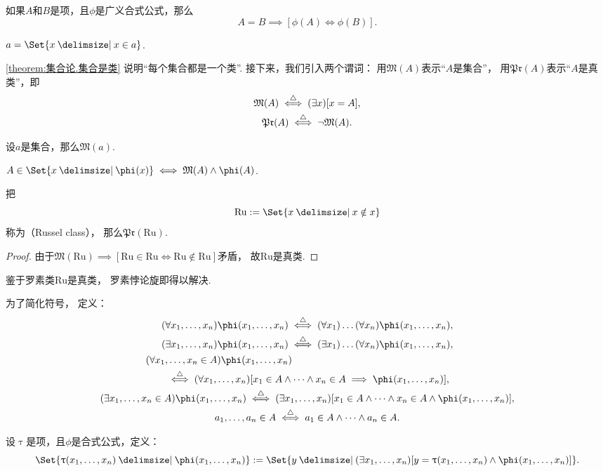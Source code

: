 \begin{theorem}
如果\(A\)和\(B\)是项，且\(\phi\)是广义合式公式，那么\begin{equation*}
	A=B \implies [\phi(A)\iff\phi(B)].
\end{equation*}
\end{theorem}

\begin{theorem}\label{theorem:集合论.集合是类}
\(a=\Set{ x \given x \in a }\).
\end{theorem}
\cref{theorem:集合论.集合是类} 说明“每个集合都是一个类”.
接下来，我们引入两个谓词：
用\(\mathfrak{M}(A)\)表示“\(A\)是集合”，
用\(\mathfrak{Pr}(A)\)表示“\(A\)是真类”，即\begin{gather*}
	\mathfrak{M}(A) \overset{\triangle}{\iff} (\exists x)[x = A], \\
	\mathfrak{Pr}(A) \overset{\triangle}{\iff} \neg\mathfrak{M}(A).
\end{gather*}

\begin{theorem}
设\(a\)是集合，那么\(\mathfrak{M}(a)\).
\end{theorem}

\begin{theorem}
\(A \in \Set{ x \given \phi(x) } \iff \mathfrak{M}(A) \land \phi(A)\).
\end{theorem}

\begin{theorem}
\def\Ru{\mathrm{Ru}}
把\begin{equation*}
	\Ru \defeq \Set{ x \given x \notin x }
\end{equation*}称为{\rm{}（Russel class）}，
那么\(\mathfrak{Pr}(\Ru)\).
\begin{proof}
由于\(\mathfrak{M}(\Ru)
\implies
[\Ru\in\Ru\iff\Ru\notin\Ru]\)矛盾，
故\(\Ru\)是真类.
\end{proof}
\end{theorem}
鉴于罗素类\(\mathrm{Ru}\)是真类，
罗素悖论旋即得以解决.

\begin{definition}
为了简化符号，
\def\x{x_1,\dotsc,x_n}
定义：\begin{gather}
	(\forall\x)\phi(\x)
	\defiff
	(\forall x_1)\dotso(\forall x_n)\phi(\x), \\
	(\exists\x)\phi(\x)
	\defiff
	(\exists x_1)\dotso(\forall x_n)\phi(\x), \\
	\begin{split}
		&\hspace{-20pt}
		(\forall\x\in A)\phi(\x) \\
		&\defiff
		(\forall\x)[x_1\in A \land \dotsb \land x_n\in A \implies \phi(\x)],
	\end{split} \\
	(\exists\x\in A)\phi(\x)
	\defiff
	(\exists\x)[x_1 \in A \land \dotsb \land x_n\in A \land \phi(\x)], \\
	a_1,\dotsc,a_n\in A \defiff a_1\in A \land \dotsb \land a_n\in A.
\end{gather}
\end{definition}

\begin{definition}
\def\x{x_1,\dotsc,x_n}
设\(\uptau\)是项，且\(\phi\)是合式公式，定义：\begin{equation}
	\Set{ \uptau(\x) \given \phi(\x) }
	\defeq
	\Set{ y \given (\exists\x)[y = \uptau(\x) \land \phi(\x)] }.
\end{equation}
\end{definition}
